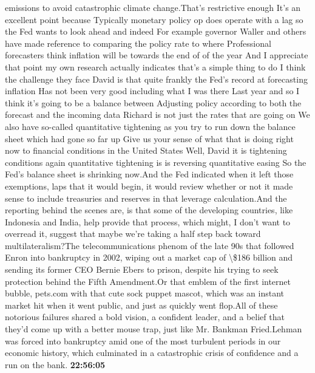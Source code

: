 \documentclass{article}%
\begin{document}
emissions to avoid catastrophic climate change.That's restrictive enough It's an excellent point because Typically monetary policy op does operate with a lag so the Fed wants to look ahead and indeed For example governor Waller and others have made reference to comparing the policy rate to where Professional forecasters think inflation will be towards the end of of the year And I appreciate that point my own research actually indicates that's a simple thing to do I think the challenge they face David is that quite frankly the Fed's record at forecasting inflation Has not been very good including what I was there Last year and so I think it's going to be a balance between Adjusting policy according to both the forecast and the incoming data Richard is not just the rates that are going on We also have so{-}called quantitative tightening as you try to run down the balance sheet which had gone so far up Give us your sense of what that is doing right now to financial conditions in the United States Well, David it is tightening conditions again quantitative tightening is is reversing quantitative easing So the Fed's balance sheet is shrinking now.And the Fed indicated when it left those exemptions, laps that it would begin, it would review whether or not it made sense to include treasuries and reserves in that leverage calculation.And the reporting behind the scenes are, is that some of the developing countries, like Indonesia and India, help provide that process, which might, I don't want to overread it, suggest that maybe we're taking a half step back toward multilateralism?The telecommunications phenom of the late 90s that followed Enron into bankruptcy in 2002, wiping out a market cap of \textbackslash{}\$186 billion and sending its former CEO Bernie Ebers to prison, despite his trying to seek protection behind the Fifth Amendment.Or that emblem of the first internet bubble, pets.com with that cute sock puppet mascot, which was an instant market hit when it went public, and just as quickly went flop.All of these notorious failures shared a bold vision, a confident leader, and a belief that they'd come up with a better mouse trap, just like Mr. Bankman Fried.Lehman was forced into bankruptcy amid one of the most turbulent periods in our economic history, which culminated in a catastrophic crisis of confidence and a run on the bank.%
\textbf{22:56:05}%
\newline%
\end{document}
